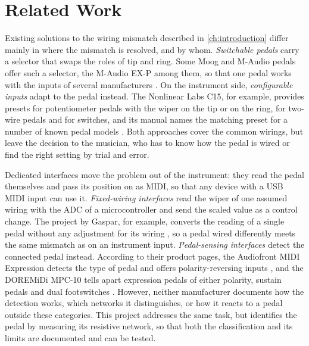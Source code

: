 
\chapter{Related Work}
\label{ch:related-work}

Existing solutions to the wiring mismatch described in \cref{ch:introduction} differ mainly in where the mismatch is resolved, and by whom. \emph{Switchable pedals} carry a selector that swaps the roles of tip and ring. Some Moog and M-Audio pedals offer such a selector, the M-Audio EX-P among them, so that one pedal works with the inputs of several manufacturers \cite{maudio2026exp, nonlinearlabs2026pedals}. On the instrument side, \emph{configurable inputs} adapt to the pedal instead. The Nonlinear Labs C15, for example, provides presets for potentiometer pedals with the wiper on the tip or on the ring, for two-wire pedals and for switches, and its manual names the matching preset for a number of known pedal models \cite{nonlinearlabs2026pedals}. Both approaches cover the common wirings, but leave the decision to the musician, who has to know how the pedal is wired or find the right setting by trial and error.

Dedicated interfaces move the problem out of the instrument: they read the pedal themselves and pass its position on as MIDI, so that any device with a USB MIDI input can use it. \emph{Fixed-wiring interfaces} read the wiper of one assumed wiring with the ADC of a microcontroller and send the scaled value as a control change. The project by Gaspar, for example, converts the reading of a single pedal without any adjustment for its wiring \cite{gaspar2026diyexpression}, so a pedal wired differently meets the same mismatch as on an instrument input. \emph{Pedal-sensing interfaces} detect the connected pedal instead. According to their product pages, the Audiofront MIDI Expression detects the type of pedal and offers polarity-reversing inputs \cite{audiofront2026midiexpression}, and the DOREMiDi MPC-10 tells apart expression pedals of either polarity, sustain pedals and dual footswitches \cite{doremidi2026mpc10}. However, neither manufacturer documents how the detection works, which networks it distinguishes, or how it reacts to a pedal outside these categories. This project addresses the same task, but identifies the pedal by measuring its resistive network, so that both the classification and its limits are documented and can be tested.

